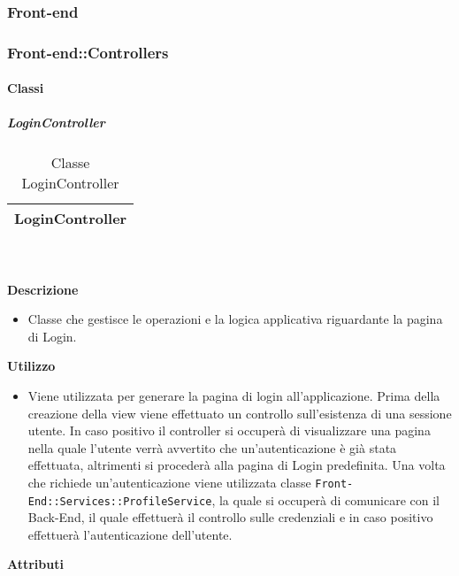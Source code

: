
	\subsubsection{Front-end} 
	\subsubsection{Front-end::Controllers} 
		\paragraph{Classi}
			\subparagraph{LoginController} 
\begin{table}[ht]
\begin{center}
\bgroup
	\setlength{\arrayrulewidth}{0.6mm}
	\def\arraystretch{1}
		\begin{tabular}{ | p{12cm} | }
				\hline  
					\centerline{\textbf{LoginController}}
		\\ \hline 
				\hline
				\hline
		
		\end{tabular}
\egroup
\caption{Classe LoginController}
\end{center}
\end{table}  \textbf{\\ \\ Descrizione} 
					\begin{itemize}
						\item[] Classe che gestisce le operazioni e la logica applicativa riguardante la pagina di Login.
					\end{itemize}      
				\textbf{Utilizzo}  
					\begin{itemize}
						\item[] Viene utilizzata per generare la pagina di login all'applicazione. Prima della creazione della view viene effettuato un controllo sull'esistenza di una sessione utente. In caso positivo il controller si occuperà di visualizzare una pagina nella quale l'utente verrà avvertito che un'autenticazione è già stata effettuata, altrimenti si procederà alla pagina di Login predefinita. Una volta che richiede un'autenticazione viene utilizzata classe \texttt{Front-End::Services::ProfileService}, la quale si occuperà di comunicare con il Back-End, il quale effettuerà il controllo sulle credenziali e in caso positivo effettuerà l'autenticazione dell'utente.
					\end{itemize}
			 \textbf{Attributi} 
	\begin{itemize}
		\end{itemize}
		
